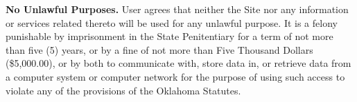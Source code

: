 \textbf{No Unlawful Purposes.}
User agrees that neither the Site nor any information or services related
thereto will be used for any unlawful purpose. It is a felony punishable by
imprisonment in the State Penitentiary for a term of not more than five (5)
years, or by a fine of not more than Five Thousand Dollars (\$5,000.00), or by
both to communicate with, store data in, or retrieve data from a computer system
or computer network for the purpose of using such access to violate any of the
provisions of the Oklahoma Statutes.
